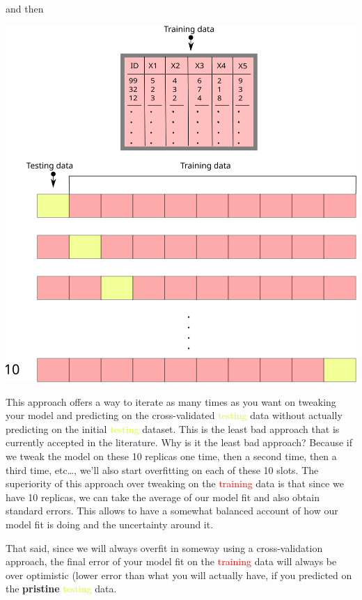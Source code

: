 \documentclass[
]{book}
\begin{document}
and then

\begin{center}\includegraphics[width=0.95\linewidth]{./img/train_cv4_smaller} \end{center}

This approach offers a way to iterate as many times as you want on tweaking your model and predicting on the cross-validated \textcolor{#D4FF2A}{testing} data without actually predicting on the initial \textcolor{#D4FF2A}{testing} dataset. This is the least bad approach that is currently accepted in the literature. Why is it the least bad approach? Because if we tweak the model on these 10 replicas one time, then a second time, then a third time, etc\ldots, we'll also start overfitting on each of these 10 slots. The superiority of this approach over tweaking on the \textcolor{red}{training} data is that since we have 10 replicas, we can take the average of our model fit and also obtain standard errors. This allows to have a somewhat balanced account of how our model fit is doing and the uncertainty around it.

That said, since we will always overfit in someway using a cross-validation approach, the final error of your model fit on the \textcolor{red}{training} data will always be over optimistic (lower error than what you will actually have, if you predicted on the \textbf{pristine} \textcolor{#D4FF2A}{testing} data.
\end{document}
